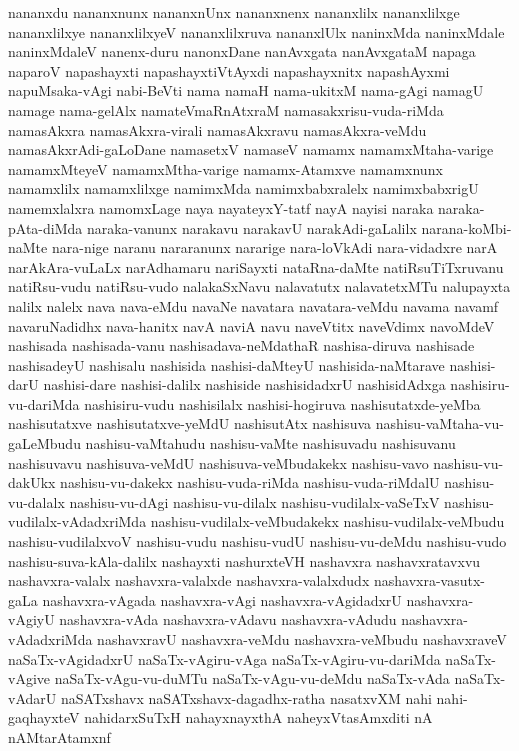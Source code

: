 {nananxdu
nananxnunx
nananxnUnx
nananxnenx
nananxlilx
nananxlilxge
nananxlilxye
nananxlilxyeV
nananxlilxruva
nananxlUlx
naninxMda
naninxMdale
naninxMdaleV
nanenx-duru
nanonxDane
nanAvxgata
nanAvxgataM
napaga
naparoV
napashayxti
napashayxtiVtAyxdi
napashayxnitx
napashAyxmi
napuMsaka-vAgi
nabi-BeVti
nama
namaH
nama-ukitxM
nama-gAgi
namagU
namage
nama-gelAlx
namateVmaRnAtxraM
namasakxrisu-vuda-riMda
namasAkxra
namasAkxra-virali
namasAkxravu
namasAkxra-veMdu
namasAkxrAdi-gaLoDane
namasetxV
namaseV
namamx
namamxMtaha-varige
namamxMteyeV
namamxMtha-varige
namamx-Atamxve
namamxnunx
namamxlilx
namamxlilxge
namimxMda
namimxbabxralelx
namimxbabxrigU
namemxlalxra
namomxLage
naya
nayateyxY-tatf
nayA
nayisi
naraka
naraka-pAta-diMda
naraka-vanunx
narakavu
narakavU
narakAdi-gaLalilx
narana-koMbi-naMte
nara-nige
naranu
nararanunx
nararige
nara-loVkAdi
nara-vidadxre
narA
narAkAra-vuLaLx
narAdhamaru
nariSayxti
nataRna-daMte
natiRsuTiTxruvanu
natiRsu-vudu
natiRsu-vudo
nalakaSxNavu
nalavatutx
nalavatetxMTu
nalupayxta
nalilx
nalelx
nava
nava-eMdu
navaNe
navatara
navatara-veMdu
navama
navamf
navaruNadidhx
nava-hanitx
navA
naviA
navu
naveVtitx
naveVdimx
navoMdeV
nashisada
nashisada-vanu
nashisadava-neMdathaR
nashisa-diruva
nashisade
nashisadeyU
nashisalu
nashisida
nashisi-daMteyU
nashisida-naMtarave
nashisi-darU
nashisi-dare
nashisi-dalilx
nashiside
nashisidadxrU
nashisidAdxga
nashisiru-vu-dariMda
nashisiru-vudu
nashisilalx
nashisi-hogiruva
nashisutatxde-yeMba
nashisutatxve
nashisutatxve-yeMdU
nashisutAtx
nashisuva
nashisu-vaMtaha-vu-gaLeMbudu
nashisu-vaMtahudu
nashisu-vaMte
nashisuvadu
nashisuvanu
nashisuvavu
nashisuva-veMdU
nashisuva-veMbudakekx
nashisu-vavo
nashisu-vu-dakUkx
nashisu-vu-dakekx
nashisu-vuda-riMda
nashisu-vuda-riMdalU
nashisu-vu-dalalx
nashisu-vu-dAgi
nashisu-vu-dilalx
nashisu-vudilalx-vaSeTxV
nashisu-vudilalx-vAdadxriMda
nashisu-vudilalx-veMbudakekx
nashisu-vudilalx-veMbudu
nashisu-vudilalxvoV
nashisu-vudu
nashisu-vudU
nashisu-vu-deMdu
nashisu-vudo
nashisu-suva-kAla-dalilx
nashayxti
nashurxteVH
nashavxra
nashavxratavxvu
nashavxra-valalx
nashavxra-valalxde
nashavxra-valalxdudx
nashavxra-vasutx-gaLa
nashavxra-vAgada
nashavxra-vAgi
nashavxra-vAgidadxrU
nashavxra-vAgiyU
nashavxra-vAda
nashavxra-vAdavu
nashavxra-vAdudu
nashavxra-vAdadxriMda
nashavxravU
nashavxra-veMdu
nashavxra-veMbudu
nashavxraveV
naSaTx-vAgidadxrU
naSaTx-vAgiru-vAga
naSaTx-vAgiru-vu-dariMda
naSaTx-vAgive
naSaTx-vAgu-vu-duMTu
naSaTx-vAgu-vu-deMdu
naSaTx-vAda
naSaTx-vAdarU
naSATxshavx
naSATxshavx-dagadhx-ratha
nasatxvXM
nahi
nahi-gaqhayxteV
nahidarxSuTxH
nahayxnayxthA
naheyxVtasAmxditi
nA
nAMtarAtamxnf
}
